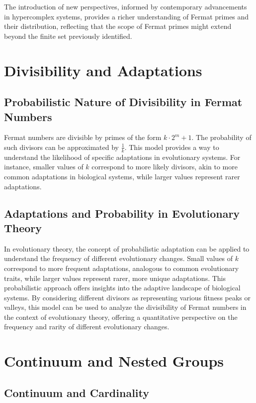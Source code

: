 \documentclass[12pt]{article}
\begin{document}
The introduction of new perspectives, informed by contemporary advancements in hypercomplex systems, provides a richer understanding of Fermat primes and their distribution, reflecting that the scope of Fermat primes might extend beyond the finite set previously identified.

\section{Divisibility and Adaptations}

\subsection{Probabilistic Nature of Divisibility in Fermat Numbers}

Fermat numbers are divisible by primes of the form \( k \cdot 2^m + 1 \). The probability of such divisors can be approximated by \( \frac{1}{k} \). This model provides a way to understand the likelihood of specific adaptations in evolutionary systems. For instance, smaller values of \( k \) correspond to more likely divisors, akin to more common adaptations in biological systems, while larger values represent rarer adaptations.

\subsection{Adaptations and Probability in Evolutionary Theory}

In evolutionary theory, the concept of probabilistic adaptation can be applied to understand the frequency of different evolutionary changes. Small values of \( k \) correspond to more frequent adaptations, analogous to common evolutionary traits, while larger values represent rarer, more unique adaptations. This probabilistic approach offers insights into the adaptive landscape of biological systems. By considering different divisors as representing various fitness peaks or valleys, this model can be used to analyze the divisibility of Fermat numbers in the context of evolutionary theory, offering a quantitative perspective on the frequency and rarity of different evolutionary changes.

\section{Continuum and Nested Groups}

\subsection{Continuum and Cardinality}
\end{document}

